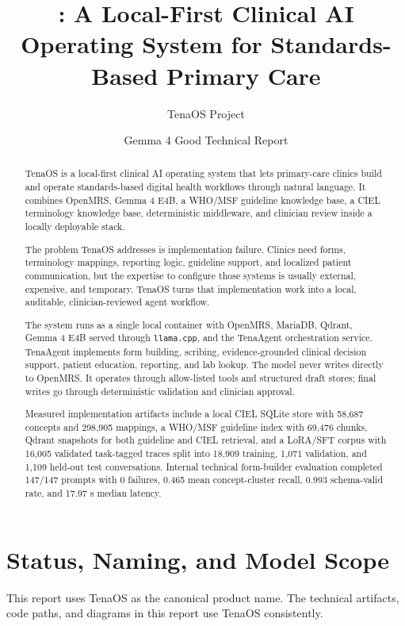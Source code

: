 \documentclass[11pt]{article}
\title{\Product: A Local-First Clinical AI Operating System for Standards-Based Primary Care}
\author{TenaOS Project}
\date{Gemma 4 Good Technical Report}
\newcommand{\Product}{TenaOS}
\newcommand{\Gemma}{Gemma 4 E4B}
\newcommand{\OpenMRS}{OpenMRS}
\newcommand{\CIEL}{CIEL}
\newcommand{\WHO}{WHO/MSF}
\begin{document}
\maketitle

\begin{abstract}
\Product{} is a local-first clinical AI operating system that lets primary-care clinics build and operate standards-based digital health workflows through natural language. It combines \OpenMRS{}, \Gemma{}, a \WHO{} guideline knowledge base, a \CIEL{} terminology knowledge base, deterministic middleware, and clinician review inside a locally deployable stack.

The problem \Product{} addresses is implementation failure. Clinics need forms, terminology mappings, reporting logic, guideline support, and localized patient communication, but the expertise to configure those systems is usually external, expensive, and temporary. \Product{} turns that implementation work into a local, auditable, clinician-reviewed agent workflow.

The system runs as a single local container with \OpenMRS{}, MariaDB, Qdrant, \Gemma{} served through \texttt{llama.cpp}, and the TenaAgent orchestration service. TenaAgent implements form building, scribing, evidence-grounded clinical decision support, patient education, reporting, and lab lookup. The model never writes directly to \OpenMRS{}. It operates through allow-listed tools and structured draft stores; final writes go through deterministic validation and clinician approval.

Measured implementation artifacts include a local \CIEL{} SQLite store with 58,687 concepts and 298,905 mappings, a \WHO{} guideline index with 69,476 chunks, Qdrant snapshots for both guideline and \CIEL{} retrieval, and a LoRA/SFT corpus with 16,005 validated task-tagged traces split into 18,909 training, 1,071 validation, and 1,109 held-out test conversations. Internal technical form-builder evaluation completed 147/147 prompts with 0 failures, 0.465 mean concept-cluster recall, 0.993 schema-valid rate, and 17.97 s median latency.
\end{abstract}

\section{Status, Naming, and Model Scope}

This report uses \Product{} as the canonical product name. The technical artifacts, code paths, and diagrams in this report use \Product{} consistently.
\end{document}
